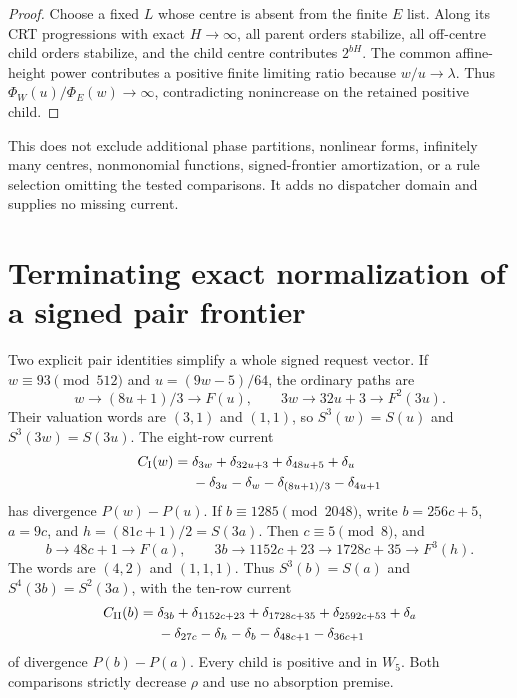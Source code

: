 \documentclass[11pt]{article}
\begin{document}
\begin{proof}
Choose a fixed $L$ whose centre is absent from the finite $E$ list.
Along its CRT progressions with exact $H\to\infty$, all parent orders
stabilize, all off-centre child orders stabilize, and the child centre
contributes $2^{bH}$. The common affine-height power contributes a
positive finite limiting ratio because $w/u\to\lambda$.
Thus $\Phi_W(u)/\Phi_E(w)\to\infty$, contradicting nonincrease on
the retained positive child.
\end{proof}

This does not exclude additional phase partitions, nonlinear forms,
infinitely many centres, nonmonomial functions, signed-frontier
amortization, or a rule selection omitting the tested comparisons.
It adds no dispatcher domain and supplies no missing current.

\section{Terminating exact normalization of a signed pair frontier}
Two explicit pair identities simplify a whole signed request vector.
If $w\equiv93\pmod{512}$ and $u=(9w-5)/64$, the ordinary paths are
\[
 w\longrightarrow(8u+1)/3\longrightarrow F(u),\qquad
 3w\longrightarrow32u+3\longrightarrow F^2(3u).
\]
Their valuation words are $(3,1)$ and $(1,1)$, so
$S^3(w)=S(u)$ and $S^3(3w)=S(3u)$. The eight-row current
\begin{align*}
 C_{\rm I}(w)={}&\delta_{3w}+\delta_{32u+3}+\delta_{48u+5}+\delta_u\\
 &-\delta_{3u}-\delta_w-\delta_{(8u+1)/3}-\delta_{4u+1}
\end{align*}
has divergence $P(w)-P(u)$.
If $b\equiv1285\pmod{2048}$, write $b=256c+5$, $a=9c$, and
$h=(81c+1)/2=S(3a)$. Then $c\equiv5\pmod8$, and
\[
 b\longrightarrow48c+1\longrightarrow F(a),\qquad
 3b\longrightarrow1152c+23\longrightarrow1728c+35
       \longrightarrow F^3(h).
\]
The words are $(4,2)$ and $(1,1,1)$. Thus
$S^3(b)=S(a)$ and $S^4(3b)=S^2(3a)$, with the ten-row current
\begin{align*}
 C_{\rm II}(b)={}&\delta_{3b}+\delta_{1152c+23}+\delta_{1728c+35}
                  +\delta_{2592c+53}+\delta_a\\
 &-\delta_{27c}-\delta_h-\delta_b-\delta_{48c+1}-\delta_{36c+1}
\end{align*}
of divergence $P(b)-P(a)$. Every child is positive and in $W_5$.
Both comparisons strictly decrease $\rho$ and use no absorption premise.
\end{document}
